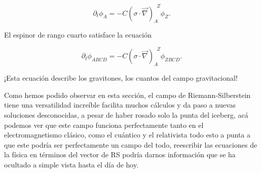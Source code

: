             \begin{equation}
                \partial_t\phi_A = -C\left(\sigma \cdot \Vec{\nabla} \right)_A^{\;\;Z}\phi_Z.
            \end{equation}

            El espinor de rango cuarto satisface la ecuación

            \begin{equation}
                \partial_t \phi_{ABCD} = -C\left( \sigma \cdot \Vec{\nabla} \right)_A^{\;\;Z}\phi_{ZBCD}.
            \end{equation}

            ¡Esta ecuación describe los gravitones, los cuantos del campo gravitacional!


            Como hemos podido observar en esta sección, el campo de Riemann-Silberstein tiene una versatilidad increíble facilita muchos cálculos y da paso a nuevas soluciones desconocidas, a pesar de haber rosado solo la punta del iceberg, acá podemos ver que este campo funciona perfectamente tanto en el electromagnetismo clásico, como el cuántico y el relativista todo esto a punta a que este podría ser perfectamente un campo del todo, reescribir las ecuaciones de la física en términos del vector de RS podría darnos información que se ha ocultado a simple vista hasta el día de hoy.